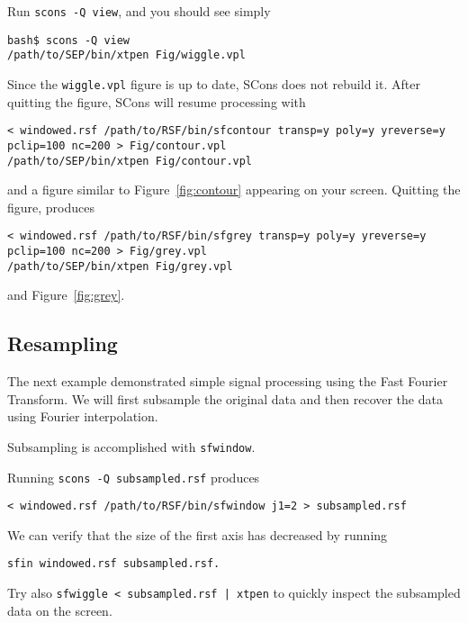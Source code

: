 Run \texttt{scons -Q view}, and you should see simply
\begin{verbatim}
bash$ scons -Q view
/path/to/SEP/bin/xtpen Fig/wiggle.vpl
\end{verbatim}
Since the \texttt{wiggle.vpl} figure is up to date, SCons does not rebuild
it. After quitting the figure, SCons will resume processing with
\begin{verbatim}
< windowed.rsf /path/to/RSF/bin/sfcontour transp=y poly=y yreverse=y 
pclip=100 nc=200 > Fig/contour.vpl
/path/to/SEP/bin/xtpen Fig/contour.vpl
\end{verbatim}
and a figure similar to Figure~\ref{fig:contour} appearing on your
screen. Quitting the figure, produces
\begin{verbatim}
< windowed.rsf /path/to/RSF/bin/sfgrey transp=y poly=y yreverse=y 
pclip=100 nc=200 > Fig/grey.vpl
/path/to/SEP/bin/xtpen Fig/grey.vpl
\end{verbatim}
and Figure~\ref{fig:grey}.


\subsection{Resampling}

The next example demonstrated simple signal processing using the Fast Fourier
Transform. We will first subsample the original data and then recover the data
using Fourier interpolation.

Subsampling is accomplished with \texttt{sfwindow}.


Running \texttt{scons -Q subsampled.rsf} produces
\begin{verbatim}
< windowed.rsf /path/to/RSF/bin/sfwindow j1=2 > subsampled.rsf
\end{verbatim}
We can verify that the size of the first axis has decreased by running

\begin{verbatim}
sfin windowed.rsf subsampled.rsf. 
\end{verbatim}

Try also \texttt{sfwiggle < subsampled.rsf | xtpen} to quickly inspect the subsampled data on the screen.

